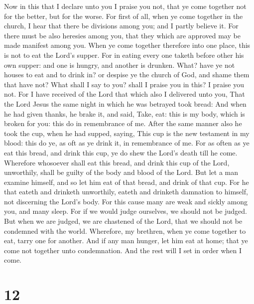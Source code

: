  Now in this that I declare unto you I praise you not, that
ye come together not for the better, but for the worse. 
For first of all, when ye come together in the church, I hear that there
be divisions among you; and I partly believe it.  For there
must be also heresies among you, that they which are approved may be
made manifest among you.  When ye come together therefore
into one place, this is not to eat the Lord's supper.  For
in eating every one taketh before other his own supper: and one is
hungry, and another is drunken.  What? have ye not houses
to eat and to drink in? or despise ye the church of God, and shame them
that have not? What shall I say to you? shall I praise you in this? I
praise you not.  For I have received of the Lord that which
also I delivered unto you, That the Lord Jesus the same night in which
he was betrayed took bread:  And when he had given thanks,
he brake it, and said, Take, eat: this is my body, which is broken for
you: this do in remembrance of me.  After the same manner
also he took the cup, when he had supped, saying, This cup is the new
testament in my blood: this do ye, as oft as ye drink it, in remembrance
of me.  For as often as ye eat this bread, and drink this
cup, ye do shew the Lord's death till he come.  Wherefore
whosoever shall eat this bread, and drink this cup of the Lord,
unworthily, shall be guilty of the body and blood of the Lord.
 But let a man examine himself, and so let him eat of that
bread, and drink of that cup.  For he that eateth and
drinketh unworthily, eateth and drinketh damnation to himself, not
discerning the Lord's body.  For this cause many are weak
and sickly among you, and many sleep.  For if we would
judge ourselves, we should not be judged.  But when we are
judged, we are chastened of the Lord, that we should not be condemned
with the world.  Wherefore, my brethren, when ye come
together to eat, tarry one for another.  And if any man
hunger, let him eat at home; that ye come not together unto
condemnation. And the rest will I set in order when I come.

\hypertarget{section-11}{%
\section{12}\label{section-11}}

